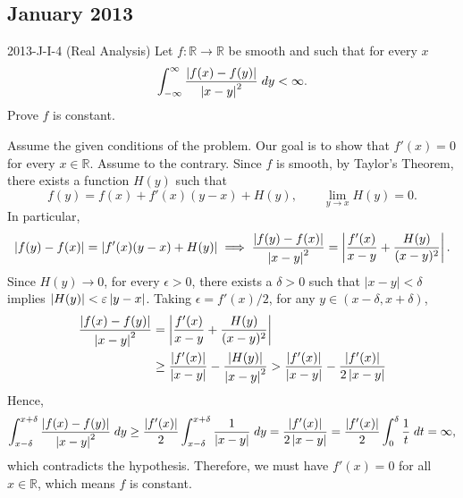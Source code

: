 \documentclass{article}
\begin{document}
\subsection{January 2013}
\begin{prb}{2013-J-I-4 (Real Analysis)}
	Let $f: \mathbb{R} \to \mathbb{R}$ be smooth and such that for every $x$ 
		\begin{equation*}
			\int_{-\infty}^{\infty}\frac{\left| f(x) - f(y) \right|}{\left| x -y \right|^{2}}\;dy < \infty. 
		\end{equation*}
	Prove $f$ is constant. 
\end{prb}
\begin{solutions}
	Assume the given conditions of the problem. Our goal is to show that $f'(x) = 0$ for every $x \in \mathbb{R}$. Assume to the contrary. Since $f$ is smooth, by Taylor's Theorem, there exists a function $H(y)$ such that 
		\begin{equation}
			f(y) = f(x) + f'(x)(y - x) + H(y), \qquad \lim_{y \to x}H(y) = 0. 
		\end{equation}
	In particular, 
		\begin{equation}
			\left| f(y) - f(x) \right| = \left| f'(x)(y -x) + H(y) \right| \implies \frac{\left| f(y) -f(x) \right|}{\left| x - y \right|^{2}} = \left|  \frac{f'(x)}{x - y} + \frac{H(y)}{(x -y)^{2}}  \right|. 
		\end{equation}
	Since $H(y) \to 0$, for every $\epsilon > 0$, there exists a $\delta > 0$ such that $|x - y| < \delta$ implies $|H(y)| < \varepsilon\left| y - x \right|$. Taking $\epsilon = f'(x)/2$, for any $y \in (x - \delta, x + \delta)$, 
		\begin{align}
			\begin{split}
				\frac{\left| f(x) - f(y) \right|}{\left| x - y \right|^{2}} &= \left| \frac{f'(x)}{x - y} + \frac{H(y)}{(x -y)^{2}}  \right| \\
				&\geq \frac{\left| f'(x) \right|}{\left| x - y \right|} - \frac{\left| H(y) \right|}{\left| x - y \right|^{2}} > \frac{\left| f'(x) \right|}{\left| x - y \right|} - \frac{\left| f'(x) \right|}{2\left| x - y \right|}
			\end{split}
		\end{align}
	Hence, 
		\begin{equation}
			\int_{x -\delta}^{x + \delta}\frac{\left| f(x) - f(y) \right|}{\left| x - y \right|^{2}}\;dy \geq \frac{\left| f'(x) \right|}{2}\int_{x - \delta}^{x + \delta}\frac{1}{\left| x - y \right|}\;dy  = \frac{\left| f'(x) \right|}{2\left| x - y \right|}= \frac{\left| f'(x) \right|}{2}\int_{0}^{\delta}\frac{1}{t}\;dt = \infty, 
		\end{equation}
	which contradicts the hypothesis. Therefore, we must have $f'(x) = 0$ for all $x \in \mathbb{R}$, which means $f$ is constant. 
\end{solutions}
\end{document}
